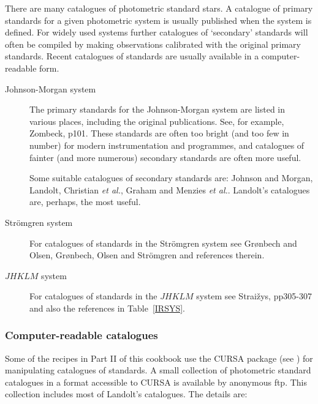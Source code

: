 \documentclass[twoside,11pt,nolof]{starlink}
\begin{document}
There are many catalogues of photometric standard stars.  A catalogue
of primary standards for a given photometric system is usually
published when the system is defined.  For widely used systems further
catalogues of `secondary' standards will often be compiled by making
observations calibrated with the original primary standards.  Recent
catalogues of standards are usually available in a computer-readable
form.

\begin{description}

  \item[Johnson-Morgan system] The primary standards for the Johnson-Morgan
   system are listed in various places, including the original publications.
   See, for example, Zombeck\cite{ZOMBECK90}, p101.  These standards are
   often too bright (and too few in number) for modern instrumentation and
   programmes, and catalogues of fainter (and more numerous) secondary
   standards are often more useful.

   Some suitable catalogues of secondary standards are:
   Johnson and Morgan\cite{JOHNSON53},
   Landolt\cite{LANDOLT73, LANDOLT83, LANDOLT83B, LANDOLT92},
   Christian \textit{et al.}\/\cite{CHRISTIAN85},
   Graham\cite{GRAHAM82} and
   Menzies \textit{et al.}\/\cite{MENZIES89, MENZIES91}.
   Landolt's catalogues are, perhaps, the most useful.


  \item[Str\"{o}mgren system] For catalogues of standards in the Str\"{o}mgren
   system see Gr\o nbech and Olsen\cite{GRONBECH77}, Gr\o nbech, Olsen and
   Str\"{o}mgren\cite{GRONBECH76} and references therein.

  \item[$JHKLM$ system] For catalogues of standards in the $JHKLM$
   system see Strai\v{z}ys\cite{STRAIZYS92}, pp305-307 and also the
   references in Table~\ref{IRSYS}.

\end{description}

\subsubsection{Computer-readable catalogues}

Some of the recipes in Part II of this cookbook use the CURSA package
(see \cite{SUN190}) for manipulating
catalogues of standards.  A small collection of photometric standard
catalogues in a format accessible to CURSA is available by anonymous
ftp.  This collection includes most of Landolt's catalogues.  The
details are:
\end{document}
